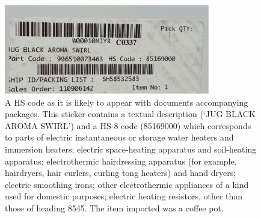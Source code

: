 \begin{figure}
    \centering
    \includegraphics[width=0.8\textwidth]{sticker.png}
    \caption{A HS code as it is likely to appear with documents accompanying packages. This sticker contains a textual description (‘JUG BLACK AROMA SWIRL’) and a HS-8 code (85169000) which corresponds to parts of electric instantaneous or storage water heaters and immersion heaters; electric space-heating apparatus and soil-heating apparatus; electrothermic hairdressing apparatus (for example, hairdryers, hair curlers, curling tong heaters) and hand dryers; electric smoothing irons; other electrothermic appliances of a kind used for domestic purposes; electric heating resistors, other than those of heading 8545. The item imported was a coffee pot.}
    \label{fig:stickers}
\end{figure}


